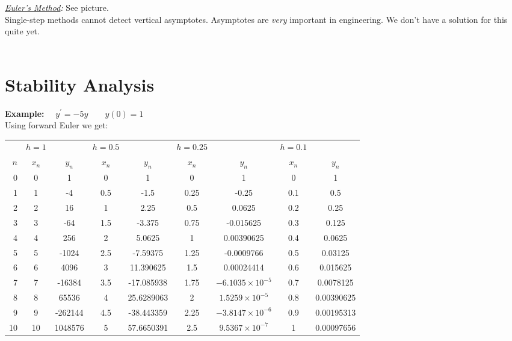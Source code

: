 \documentclass[a4paper,12pt]{report}
\begin{document}
	\noindent \textit{\underline{Euler's Method}:} See picture.\\
	Single-step methods cannot detect vertical asymptotes. Asymptotes are \textit{very} important in engineering.
	We don't have a solution for this quite yet.\\ \\

\section{Stability Analysis}


	\noindent \textbf{Example:} $\quad y^\prime = -5y \qquad y(0) = 1$ \\
	Using forward Euler we get:

\footnotesize	
\begin{center}
\begin{tabular}{r|cc|cc|cc|cc}
	& $h = 1$ && $h = 0.5$ && $h = 0.25$ && $h = 0.1$ &\\
	$n$ & $x_n$ & $y_n$ & $x_n$ & $y_n$ & $x_n$ & $y_n$ & $x_n$ & $y_n$\\
	\hline
	0&0&1&0&1&0&1&0&1\\
	1&1& -4& 0.5&-1.5&0.25&-0.25&0.1&0.5\\
	2&2& 16&1&2.25&0.5&0.0625&0.2&0.25\\
	3&3&-64&1.5&-3.375&0.75&-0.015625&0.3&0.125\\
	4&4&256&2&5.0625&1&0.00390625&0.4&0.0625\\
	5&5&-1024&2.5&-7.59375&1.25&-0.0009766&0.5&0.03125\\
	6&6&4096&3&11.390625&1.5&0.00024414&0.6&0.015625\\
	7&7&-16384&3.5&-17.085938&1.75& $-6.1035\times 10^{-5} $&0.7&0.0078125\\
	8&8&65536&4&25.6289063&2&$1.5259 \times 10^{-5}$&0.8&0.00390625\\
	9&9&-262144&4.5&-38.443359&2.25&$-3.8147 \times 10^{-6}$&0.9&0.00195313\\
	10&10&1048576&5&57.6650391&2.5&$9.5367 \times 10^{-7}$&1&0.00097656
\end{tabular}
\end{center}
\normalsize
\end{document}
